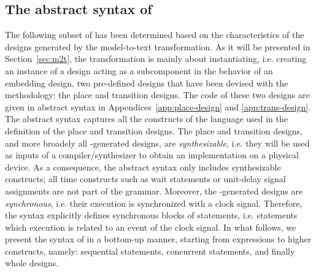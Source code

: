 \documentclass[pdflatex,sn-mathphys]{sn-jnl}%
\theoremstyle{thmstyleone}%
\theoremstyle{thmstyletwo}%
\theoremstyle{thmstylethree}%
\begin{document}
\subsection{The abstract syntax of \hvhdl{}}
\label{subsec:abs-syntax}

The following subset of \vhdl{} has been determined based on the
characteristics of the designs generated by the \hilecop{}
model-to-text transformation. As it will be presented in
Section~\ref{sec:m2t}, the \hilecop{} transformation is mainly about
instantiating, i.e. creating an instance of a design acting as a
subcomponent in the behavior of an embedding design, two pre-defined
designs that have been devised with the methodology: the place and
transition designs. The \vhdl{} code of these two designs are given in
abstract syntax in Appendices~\ref{app:place-design} and
\ref{app:trans-design}. The \hvhdl{} abstract syntax captures all the
constructs of the \vhdl{} language used in the definition of the place
and transition designs. The place and transition designs, and more
broadely all \hilecop{}-generated designs, are \textit{synthesizable},
i.e. they will be used as inputs of a compiler/synthesizer to obtain
an implementation on a physical device. As a consequence, the \hvhdl{}
abstract syntax only includes synthesizable constructs; all time
constructs such as wait statements or unit-delay signal assignments
are not part of the grammar. Moreover, the \hilecop{}-generated
designs are \textit{synchronous}, i.e. their execution is synchronized
with a clock signal. Therefore, the \hvhdl{} syntax explicitly defines
synchronous blocks of statements, i.e. statements which execution is
related to an event of the clock signal.  In what follows, we present
the syntax of \hvhdl{} in a bottom-up manner, starting from
expressions to higher constructs, namely: sequential statements,
concurrent statements, and finally whole designs.
\end{document}
